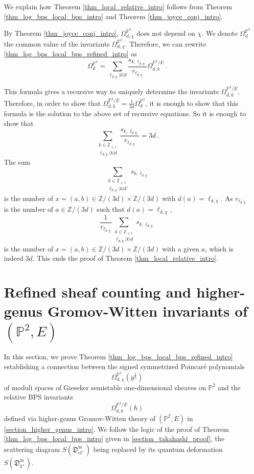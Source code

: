\documentclass[11pt,letterpaper]{amsart}
\newcommand\PP{\mathbb P}
\newcommand\Z{\mathbb Z}
\newcommand\fD{\mathfrak D}
\newcommand\cl{\operatorname{cl}}
\newcommand\iin{\mathrm{in}}
\begin{document}
We explain how Theorem \ref{thm_local_relative_intro} follows 
from Theorem \ref{thm_log_bps_local_bps_intro}
and Theorem \ref{thm_joyce_conj_intro}.

By Theorem \ref{thm_joyce_conj_intro}, $\Omega_{d,\chi}^{\PP^2}$ does not depend on $\chi$. We denote $\Omega_d^{\PP^2}$ the common value of the invariants 
$\Omega_{d,\chi}^{\PP^2}$.
Therefore, we can rewrite 
\ref{thm_log_bps_local_bps_refined_intro}
as 
\[ \Omega_d^{\PP^2}=\sum_{\ell_{d,\chi}|k|d}
\frac{s_{k,\ell_{d,\chi}}}{r_{\ell_{d,\chi}}} \Omega_{d,k}^{\PP^2/E}\,.\]

This formula gives a recursive way to uniquely determine the invariants 
$\Omega_{d,k}^{\PP^2/E}$. 
Therefore, in order to show that 
$\Omega_{d,k}^{\PP^2/E}
=\frac{1}{3d} \Omega_d^{\PP^2}$, it is enough to show that this formula is the solution to the above set of recursive equations. So it is enough to show that 
\[\sum_{\substack{k\in \Z_{\leqslant 1}\\\ell_{d,\chi}|k|d}} 
\frac{s_{k,\ell_{d,\chi}}}{r_{\ell_{d,\chi}}}=3d\,.\]
The sum
\[\sum_{\substack{k\in \Z_{\leqslant 1}\\\ell_{d,\chi}|k|d'}} 
s_{k,\ell_{d,\chi}}\]
is the number of $x=(a,b)\in \Z/(3d)\times \Z/(3d)$
with $d(a)=\ell_{d,\chi}$. 
As
$r_{\ell_{d,\chi}}$ is the number of 
$a\in \Z/(3d)$ such that $d(a)=\ell_{d,\chi}$,
\[
\frac{1}{r_{\ell_{d,\chi}}}\sum_{\substack{k\in \Z_{\leqslant 1}\\\ell_{d,\chi}|k|d}} 
s_{k,\ell_{d,\chi}}\]
is the number of $x=(a,b) \in \Z/(3d)\times
\Z/(3d)$ with a given $a$, which is indeed $3d$. This ends the proof of
Theorem \ref{thm_local_relative_intro}.




\section{Refined sheaf counting and higher-genus Gromov-Witten invariants of $(\PP^2,E)$}
\label{section_higher_genus_refinement}



In this section, we prove Theorem \ref{thm_log_bps_local_bps_refined_intro} establishing 
a connection between the signed 
symmetrized Poincar\'e polynomials 
\[ \Omega_{d,\chi}^{\PP^2}(y^{\frac{1}{2}})\]
of moduli spaces of Gieseker semistable one-dimensional sheaves on $\PP^2$ and the relative BPS invariants 
\[ \Omega_{d,k}^{\PP^2/E}(\hbar)\] 
defined via 
higher-genus Gromov-Witten theory of $(\PP^2,E)$
in \cref{section_higher_genus_intro}. 
We follow the logic of the proof of Theorem 
\ref{thm_log_bps_local_bps_intro} given in 
\cref{section_takahashi_proof}, the scattering diagram $S(\fD^{\iin}_{\cl^+})$
being replaced by its quantum deformation
$S(\fD^{\iin}_{y^+})$.
\end{document}
